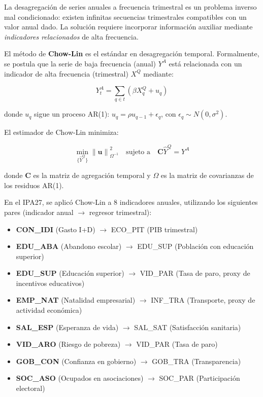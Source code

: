 \documentclass[authoryear,12pt]{elsarticle}
\begin{document}
La desagregación de series anuales a frecuencia trimestral es un problema inverso mal condicionado: existen infinitas secuencias trimestrales compatibles con un valor anual dado. La solución requiere incorporar información auxiliar mediante \textit{indicadores relacionados} de alta frecuencia.

El método de \textbf{Chow-Lin} \citep{chow1971best} es el estándar en desagregación temporal. Formalmente, se postula que la serie de baja frecuencia (anual) $Y^A$ está relacionada con un indicador de alta frecuencia (trimestral) $X^Q$ mediante:

\begin{equation}
Y^A_t = \sum_{q \in t} \left( \beta X^Q_q + u_q \right)
\end{equation}

donde $u_q$ sigue un proceso AR(1): $u_q = \rho u_{q-1} + \epsilon_q$, con $\epsilon_q \sim N(0, \sigma^2)$.

El estimador de Chow-Lin minimiza:

\begin{equation}
\min_{\{\hat{Y}^Q\}} \left\| \mathbf{u} \right\|_{\Omega^{-1}}^2 \quad \text{sujeto a} \quad \mathbf{C} \hat{Y}^Q = Y^A
\end{equation}

donde $\mathbf{C}$ es la matriz de agregación temporal y $\Omega$ es la matriz de covarianzas de los residuos AR(1).

En el IPA27, se aplicó Chow-Lin a 8 indicadores anuales, utilizando los siguientes pares (indicador anual $\to$ regresor trimestral):

\begin{itemize}
    \item \textbf{CON\_IDI} (Gasto I+D) $\to$ ECO\_PIT (PIB trimestral)
    \item \textbf{EDU\_ABA} (Abandono escolar) $\to$ EDU\_SUP (Población con educación superior)
    \item \textbf{EDU\_SUP} (Educación superior) $\to$ VID\_PAR (Tasa de paro, proxy de incentivos educativos)
    \item \textbf{EMP\_NAT} (Natalidad empresarial) $\to$ INF\_TRA (Transporte, proxy de actividad económica)
    \item \textbf{SAL\_ESP} (Esperanza de vida) $\to$ SAL\_SAT (Satisfacción sanitaria)
    \item \textbf{VID\_ARO} (Riesgo de pobreza) $\to$ VID\_PAR (Tasa de paro)
    \item \textbf{GOB\_CON} (Confianza en gobierno) $\to$ GOB\_TRA (Transparencia)
    \item \textbf{SOC\_ASO} (Ocupados en asociaciones) $\to$ SOC\_PAR (Participación electoral)
\end{itemize}
\end{document}
